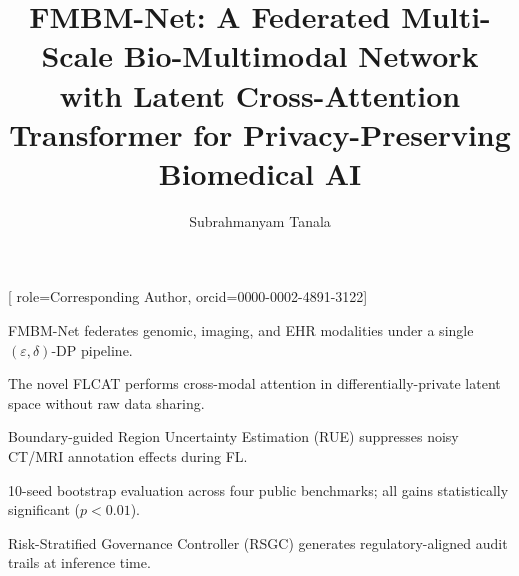 \documentclass[a4paper,fleqn]{cas-dc}
\begin{document}
\let\WriteBookmarks\relax
\def\floatpagepagefraction{1}
\def\textpagefraction{.001}

\title[mode=title]{FMBM-Net: A Federated Multi-Scale Bio-Multimodal Network
with Latent Cross-Attention Transformer for Privacy-Preserving Biomedical AI}

\tnotemark[1]

\author[1]{Subrahmanyam Tanala}[
  role=Corresponding Author,
  orcid=0000-0002-4891-3122]
\cormark[1]
\fnmark[1]



\begin{highlights}
\sloppy
\item FMBM-Net federates genomic, imaging, and EHR modalities under a single \texorpdfstring{$(\varepsilon,\delta)$}{(epsilon,delta)}-DP pipeline.
\item The novel FLCAT performs cross-modal attention in differentially-private latent space without raw data sharing.
\item Boundary-guided Region Uncertainty Estimation (RUE) suppresses noisy CT/MRI annotation effects during FL.
\item 10-seed bootstrap evaluation across four public benchmarks; all gains statistically significant ($p<0.01$).
\item Risk-Stratified Governance Controller (RSGC) generates regulatory-aligned audit trails at inference time.
\end{highlights}
\end{document}
